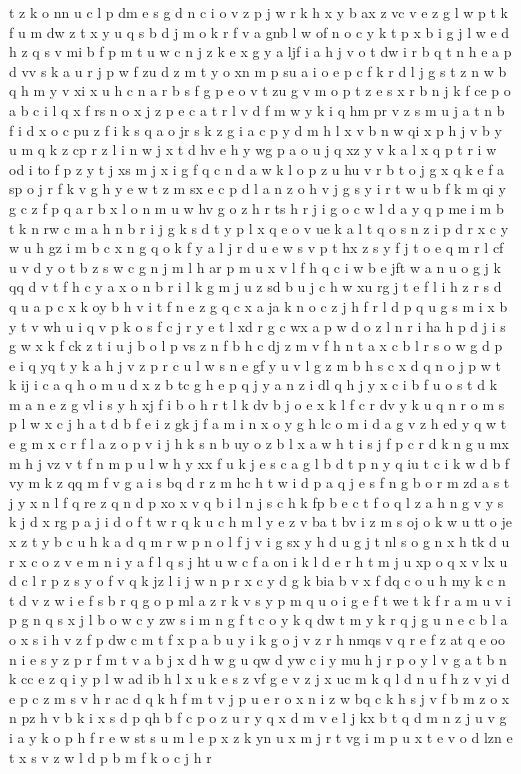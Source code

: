\documentclass{article}
\begin{document}
t z k o nn u c l p dm e s g d n c i o v z p j w r k h x y b ax z vc v e z g l w p t k f u m dw z t x y u q s b d j m o k r f v a gnb l w of n o c y k t p x b i g j l w e d h z q s v mi b f p m t u w c n j z k e x g y a ljf i a h j v o t dw i r b q t n h e a p d vv s k a u r j p w f zu d z m t y o xn m p su a i o e p c f k r d l j g s t z n w b q h m y v xi x u h c n a r b s f g p e o v t zu g v m o p t z e s x r b n j k f ce p o a b c i l q x f rs n o x j z p e c a t r l v d f m w y k i q hm pr v z s m u j a t n b f i d x o c pu z f i k s q a o jr s k z g i a c p y d m h l x v b n w qi x p h j v b y u m q k z cp r z l i n w j x t d hv e h y wg p a o u j q xz y v k a l x q p t r i w od i to f p z y t j xs m j x i g f q c n d a w k l o p z u hu v r b t o j g x q k e f a sp o j r f k v g h y e w t z m sx e c p d l a n z o h v j g s y i r t w u b f k m qi y g c z f p q a r b x l o n m u w hv g o z h r ts h r j i g o c w l d a y q p me i m b t k n rw c m a h n b r i j g k s d t y p l x q e o v ue k a l t q o s n z i p d r x c y w u h gz i m b c x n g q o k f y a l j r d u e w s v p t hx z s y f j t o e q m r l cf u v d y o t b z s w c g n j m l h ar p m u x v l f h q c i w b e jft w a n u o g j k qq d v t f h c y a x o n b r i l k g m j u z sd b u j c h w xu rg j t e f l i h z r s d q u a p c x k oy b h v i t f n e z g q c x a ja k n o c z j h f r l d p q u g s m i x b y t v wh u i q v p k o s f c j r y e t l xd r g c wx a p w d o z l n r i ha h p d j i s g w x k f ck z t i u j b o l p vs z n f b h c dj z m v f h n t a x c b l r s o w g d p e i q yq t y k a h j v z p r c u l w s n e gf y u v l g z m b h s c x d q n o j p w t k ij i c a q h o m u d x z b tc g h e p q j y a n z i dl q h j y x c i b f u o s t d k m a n e z g vl i s y h xj f i b o h r t l k dv b j o e x k l f c r dv y k u q n r o m s p l w x c j h a t d b f e i z gk j f a m i n x o y g h lc o m i d a g v z h ed y q w t e g m x c r f l a z o p v i j h k s n b uy o z b l x a w h t i s j f p c r d k n g u mx m h j vz v t f n m p u l w h y xx f u k j e s c a g l b d t p n y q iu t c i k w d b f vy m k z qq m f v g a i s bq d r z m hc h t w i d p a q j e s f n g b o r m zd a s t j y x n l f q re z q n d p xo x v q b i l n j s c h k fp b e c t f o q l z a h n g v y s k j d x rg p a j i d o f t w r q k u c h m l y e z v ba t bv i z m s oj o k w u tt o je x z t y b c u h k a d q m r w p n o l f j v i g sx y h d u g j t nl s o g n x h tk d u r x c o z v e m n i y a f l q s j ht u w c f a on i k l d e r h t m j u xp o q x v lx u d c l r p z s y o f v q k jz l i j w n p r x c y d g k bia b v x f dq c o u h my k c n t d v z w i e f s b r q g o p ml a z r k v s y p m q u o i g e f t we t k f r a m u v i p g n q s x j l b o w c y zw s i m n g f t c o y k q dw t m y k r q j g u n e c b l a o x s i h v z f p dw c m t f x p a b u y i k g o j v z r h nmqs v q r e f z at q e oo n i e s y z p r f m t v a b j x d h w g u qw d yw c i y mu h j r p o y l v g a t b n k cc e z q i y p l w ad ib h l x u k e s z vf g e v z j x uc m k q l d n u f h z v yi d e p c z m s v h r ac d q k h f m t v j p u e r o x n i z w bq c k h s j v f b m z o x n pz h v b k i x s d p qh b f c p o z u r y q x d m v e l j kx b t q d m n z j u v g i a y k o p h f r e w st s u m l e p x z k yn u x m j r t vg i m p u x t e v o d lzn e t x s v z w l d p b m f k o c j h r 
\end{document}
